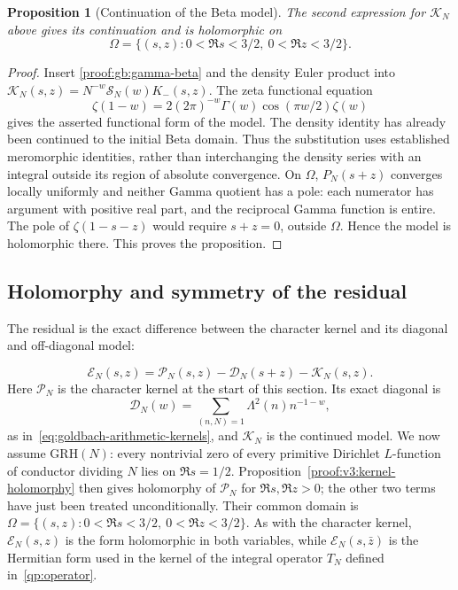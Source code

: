 \documentclass[12pt,a4paper]{amsart}
\numberwithin{equation}{section}
\theoremstyle{plain}
\newtheorem{proposition}{Proposition}[section]
\theoremstyle{definition}
\theoremstyle{remark}
\begin{document}
\begin{proposition}[Continuation of the Beta model]\label{proof:v3:model-geometry}
The second expression for $\mathscr K_N$ above gives its continuation
and is holomorphic on
\[
 \Omega=\{(s,z):0<\Re s<3/2,\ 0<\Re z<3/2\}.
\]
\end{proposition}

\begin{proof}
Insert \eqref{proof:gb:gamma-beta} and the density Euler product into
$\mathscr K_N(s,z)=N^{-w}\mathscr S_N(w)K_-(s,z)$.
The zeta functional equation
\[
 \zeta(1-w)=2(2\pi)^{-w}\Gamma(w)\cos(\pi w/2)\zeta(w)
\]
gives the asserted functional form of the model.
The density identity has already been continued to the initial
Beta domain. Thus the substitution uses established meromorphic
identities, rather than interchanging the density series with an
integral outside its region of absolute convergence.
On $\Omega$, $P_N(s+z)$ converges locally uniformly and neither
Gamma quotient has a pole: each numerator has argument with
positive real part, and the reciprocal Gamma function is entire.
The pole of $\zeta(1-s-z)$ would require $s+z=0$, outside
$\Omega$. Hence the model is holomorphic there.
This proves the proposition.
\end{proof}

\subsection{Holomorphy and symmetry of the residual}

The residual is the exact difference between the character kernel
and its diagonal and off-diagonal model:

\[
 \mathscr E_N(s,z)=\mathscr P_N(s,z)
                  -\mathscr D_N(s+z)-\mathscr K_N(s,z).
\]
Here $\mathscr P_N$ is the character kernel at the start of this
section. Its exact diagonal is
\[
 \mathscr D_N(w)=\sum_{(n,N)=1}\Lambda^2(n)n^{-1-w},
\]
as in~\eqref{eq:goldbach-arithmetic-kernels},
and $\mathscr K_N$ is the continued model.
We now assume $\mathrm{GRH}(N)$: every nontrivial zero of every
primitive Dirichlet $L$-function of conductor dividing $N$ lies on
$\Re s=1/2$. Proposition~\ref{proof:v3:kernel-holomorphy} then
gives holomorphy of $\mathscr P_N$ for $\Re s,\Re z>0$;
the other two terms have just been treated unconditionally.
Their common domain is
$\Omega=\{(s,z):0<\Re s<3/2,\ 0<\Re z<3/2\}$.
As with the character kernel, $\mathscr E_N(s,z)$ is the form
holomorphic in both variables, while $\mathscr E_N(s,\bar z)$
is the Hermitian form used in the kernel of the integral operator
$T_N$ defined in~\eqref{qp:operator}.
\end{document}
